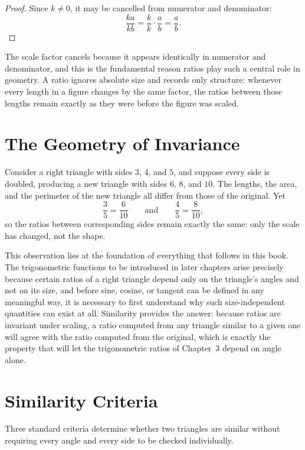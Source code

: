 \begin{proof}
Since $k \neq 0$, it may be cancelled from numerator and denominator:
\[
\frac{ka}{kb} = \frac{k}{k}\cdot\frac{a}{b} = \frac{a}{b}.
\]
\end{proof}

The scale factor cancels because it appears identically in numerator and
denominator, and this is the fundamental reason ratios play such a central
role in geometry. A ratio ignores absolute size and records only structure:
whenever every length in a figure changes by the same factor, the ratios
between those lengths remain exactly as they were before the figure was
scaled.

\section{The Geometry of Invariance}

\begin{example}
Consider a right triangle with sides $3$, $4$, and $5$, and suppose every
side is doubled, producing a new triangle with sides $6$, $8$, and $10$. The
lengths, the area, and the perimeter of the new triangle all differ from
those of the original. Yet
\[
\frac{3}{5} = \frac{6}{10} \qquad\text{and}\qquad \frac{4}{5} = \frac{8}{10},
\]
so the ratios between corresponding sides remain exactly the same: only the
scale has changed, not the shape.
\end{example}

This observation lies at the foundation of everything that follows in this
book. The trigonometric functions to be introduced in later chapters arise
precisely because certain ratios of a right triangle depend only on the
triangle's angles and not on its size, and before sine, cosine, or tangent
can be defined in any meaningful way, it is necessary to first understand why
such size-independent quantities can exist at all. Similarity provides the
answer: because ratios are invariant under scaling, a ratio computed from any
triangle similar to a given one will agree with the ratio computed from the
original, which is exactly the property that will let the trigonometric
ratios of Chapter~3 depend on angle alone.

\section{Similarity Criteria}

Three standard criteria determine whether two triangles are similar without
requiring every angle and every side to be checked individually.

